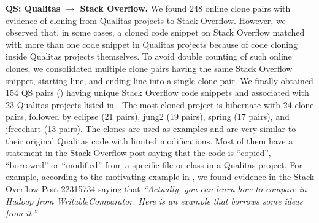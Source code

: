 \documentclass[10pt,journal,compsoc]{IEEEtran}
\begin{document}
\textbf{QS: Qualitas $\rightarrow$ Stack Overflow.} We found 248 online clone
pairs with evidence of cloning from Qualitas projects to Stack Overflow.
However, we observed that, in some cases, a cloned code snippet on Stack
Overflow matched with more than one code snippet in Qualitas projects because of
code cloning inside Qualitas projects themselves. To avoid double counting of
such online clones, we consolidated multiple clone pairs having the same Stack
Overflow snippet, starting line, and ending line into a single clone pair. We
finally obtained 154 QS pairs () having unique Stack Overflow code snippets and
associated with 23 Qualitas projects listed in .
The most cloned project is \textsf{hibernate} with 24
clone pairs, followed by \textsf{eclipse} (21 pairs), \textsf{jung2} (19 pairs),
\textsf{spring} (17 pairs), and \textsf{jfreechart} (13 pairs). The clones are
used as examples and are very similar to their original Qualitas code with
limited modifications. Most of them have a statement in the Stack Overflow post
saying that the code is ``copied'', ``borrowed'' or ``modified'' from a specific
file or class in a Qualitas project. For example, according to the motivating
example in , we found evidence in the Stack Overflow Post
22315734 saying that \textit{``Actually, you can learn how to compare in Hadoop
from WritableComparator. Here is an example that borrows some ideas from it.''}
\end{document}
